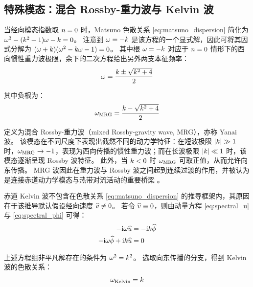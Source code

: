 \subsection{特殊模态：混合 Rossby-重力波与 Kelvin 波}
\label{subsec:special_modes}

当经向模态指数取 $n = 0$ 时，Matsuno 色散关系 \eqref{eq:matsuno_dispersion} 简化为 $\omega^3 - (k^2+1)\omega - k = 0$。
注意到 $\omega = -k$ 是该方程的一个显式解，因此可将其因式分解为 $(\omega + k)(\omega^2 - k\omega - 1) = 0$。
其中根 $\omega = -k$ 对应于 $n = 0$ 情形下的西向惯性重力波极限，余下的二次方程给出另外两支本征频率：
\begin{equation}
    \omega = \frac{k \pm \sqrt{k^2 + 4}}{2}
\end{equation}

其中负根为：
\begin{equation}
    \omega_{\mathrm{MRG}} = \frac{k - \sqrt{k^2 + 4}}{2}
    \label{eq:MRG_dispersion}
\end{equation}

定义为混合 Rossby-重力波（mixed Rossby-gravity wave, MRG），亦称 Yanai 波。
该模态在不同尺度下表现出截然不同的动力学特征：在短波极限 $\lvert k \rvert \gg 1$ 时，$\omega_{\mathrm{MRG}} \to -1$，表现为西向传播的惯性重力波；而在长波极限 $\lvert k \rvert \ll 1$ 时，该模态逐渐呈现 Rossby 波特征。
此外，当 $k < 0$ 时 $\omega_{\mathrm{MRG}}$ 可取正值，从而允许向东传播。
MRG 波因此在重力波与 Rossby 波之间起到连续过渡的作用，并被认为是连接赤道动力学模态与热带对流活动的重要桥梁 \citep{Aiyyer2003, Braga2025}。

赤道 Kelvin 波不包含在色散关系 \eqref{eq:matsuno_dispersion} 的推导框架内，其原因在于该推导默认假设经向速度 $\widehat{v} \neq 0$。
若令 $\widehat{v} \equiv 0$，则由动量方程 \eqref{eq:spectral_u} 与 \eqref{eq:spectral_phi} 可得：
\begin{align}
    -\mathrm{i}\omega\widehat{u} &= -\mathrm{i}k\widehat{\phi} \\
    -\mathrm{i}\omega\widehat{\phi} + \mathrm{i}k\widehat{u} &= 0
\end{align}

上述方程组非平凡解存在的条件为 $\omega^2 = k^2$。
选取向东传播的分支，得到 Kelvin 波的色散关系：
\begin{equation}
    \omega_{\mathrm{Kelvin}} = k
    \label{eq:Kelvin_dispersion}
\end{equation}

